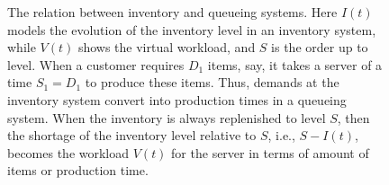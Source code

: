 \begin{figure}[th]
\begin{center}
\end{center}
\caption{The relation between inventory and queueing systems. Here $I(t)$ models the evolution of the inventory level in an  inventory system, while $V(t)$ shows the virtual workload, and $S$ is the order up to level. When a customer requires $D_1$ items, say, it takes a server of a time $S_1=D_1$ to produce these items. Thus, demands at the inventory system convert into production times in a queueing system.  When the inventory is always replenished to level $S$, then the shortage of the inventory level relative to $S$, i.e., $S-I(t)$, becomes the workload $V(t)$ for the server in terms of amount of items or production time.} \label{fig:inv_queue}
\end{figure}


